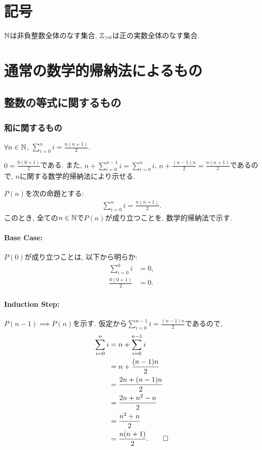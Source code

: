 \section{記号}
$\mathbb{N}$は非負整数全体のなす集合,
$\mathbb{Z}_{>0}$は正の実数全体のなす集合.
\section{通常の数学的帰納法によるもの}
\subsection{整数の等式に関するもの}
\subsubsection{和に関するもの}
\begin{prop}
  \label{p:20230630}
  $\forall n\in\mathbb{N}$,
  $\sum_{i=0}^{n}i=\frac{n(n+1)}{2}$.
\end{prop}
\begin{proof**}
  $0=\frac{0(0+1)}{2}$である.
  また,
  $n+\sum_{i=0}^{n-1}i=\sum_{i=0}^{n}i$,
  $n+\frac{(n-1)n}{2}=\frac{n(n+1)}{2}$であるので,
  $n$に関する数学的帰納法により示せる.
\end{proof**}
\begin{proof*}
  $P(n)$を次の命題とする:
  \begin{align*}
    \sum_{i=0}^{n}i=\frac{n(n+1)}{2}.
  \end{align*}
  このとき, 全ての$n\in\mathbb{N}$で$P(n)$が成り立つことを,
  数学的帰納法で示す.

  \paragraph{Base Case:}
  $P(0)$が成り立つことは, 以下から明らか:
  \begin{align*}
    \sum_{i=0}^{0}i&=0,\\
    \frac{0(0+1)}{2}&=0.
  \end{align*}

  \paragraph{Induction Step:}
  $P(n-1)\implies P(n)$を示す.
  仮定から$\sum_{i=0}^{n-1}i=\frac{(n-1)n}{2}$であるので,
  \begin{align*}
    \sum_{i=0}^{n}i&=n+\sum_{i=0}^{n-1}i\\
    &=n+\frac{(n-1)n}{2}\\
    &=\frac{2n+(n-1)n}{2}\\
    &=\frac{2n+n^2-n}{2}\\
    &=\frac{n^2+n}{2}\\
    &=\frac{n(n+1)}{2}.
    \qedhere
  \end{align*}
\end{proof*}
